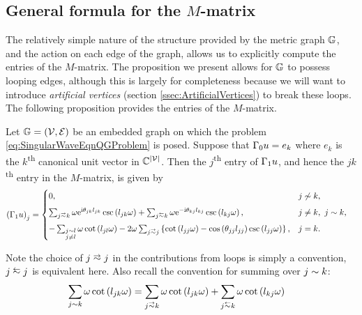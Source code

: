\subsection{General formula for the $M$-matrix} \label{ssec:MMatrixResult}
The relatively simple nature of the structure provided by the metric graph $\mathbb{G}$, and the action on each edge of the graph, allows us to explicitly compute the entries of the $M$-matrix.
The proposition we present allows for $\mathbb{G}$ to possess looping edges, although this is largely for completeness because we will want to introduce \emph{artificial vertices} (section \ref{ssec:ArtificialVertices}) to break these loops.
The following proposition provides the entries of the $M$-matrix.
\begin{prop} \label{prop:M-MatrixEntries}
	Let $\mathbb{G}=\left( \mathcal{V},\mathcal{E} \right)$ be an embedded graph on which the problem \eqref{eq:SingularWaveEqnQGProblem} is posed.
	Suppose that $\Gamma_0 u = e_k$ where $e_k$ is the $k$\textsuperscript{th} canonical unit vector in $\mathbb{C}^{\left\lvert \mathcal{V} \right\rvert}$.
	Then the $j$\textsuperscript{th} entry of $\Gamma_1 u$, and hence the $jk$\textsuperscript{th} entry in the $M$-matrix, is given by
	\begin{align*}
		\bracs{\nmap u}_j &= 
		\begin{cases}
			0,	
			& j \not\con k, \\[5pt]
			\sum_{j\conLeft k} \omega \e^{\rmi\qm_{jk}l_{jk}} \csc\bracs{l_{jk}\omega} 
			+ \sum_{j\conRight k} \omega \e^{-\rmi\qm_{kj}l_{kj}} \csc\bracs{l_{kj}\omega},
			& j\neq k, \ j\con k, \\[5pt]
			- \sum_{\substack{j\con l \\ j\neq l}} \omega\cot\bracs{l_{jl}\omega}
			- 2\omega\sum_{j\conLeft j} \clbracs{ \cot\bracs{l_{jj}\omega} - \cos\bracs{\qm_{jj}l_{jj}}\csc\bracs{l_{jj}\omega} },
			& j=k.
		\end{cases}
	\end{align*}
\end{prop}
Note the choice of $j\conLeft j$ in the contributions from loops is simply a convention, $j\conRight j$ is equivalent here.
Also recall the convention for summing over $j\sim k$:
\begin{align*}
	\sum_{j\con k} \omega\cot\bracs{l_{jk}\omega} &= \sum_{j\conLeft k} \omega\cot\bracs{l_{jk}\omega}	+ \sum_{j\conRight k} \omega\cot\bracs{l_{kj}\omega}
\end{align*}
